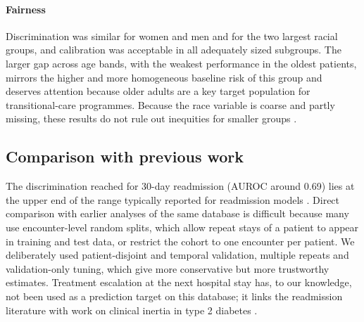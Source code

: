 \paragraph{Fairness}
Discrimination was similar for women and men and for the two largest racial
groups, and calibration was acceptable in all adequately sized subgroups.
The larger gap across age bands, with the weakest performance in the oldest
patients, mirrors the higher and more homogeneous baseline risk of this
group and deserves attention because older adults are a key target
population for transitional-care programmes. Because the race variable is
coarse and partly missing, these results do not rule out inequities for
smaller groups \citep{obermeyer2019}.

\subsection{Comparison with previous work}
The discrimination reached for 30-day readmission (AUROC around 0.69) lies
at the upper end of the range typically reported for readmission models
\citep{kansagara2011}. Direct comparison with earlier analyses of the same
database is difficult because many use encounter-level random splits, which
allow repeat stays of a patient to appear in training and test data, or
restrict the cohort to one encounter per patient. We deliberately used
patient-disjoint and temporal validation, multiple repeats and validation-only
tuning, which give more conservative but more trustworthy estimates.
Treatment escalation at the next hospital stay has, to our knowledge, not
been used as a prediction target on this database; it links the readmission
literature with work on clinical inertia in type 2 diabetes
\citep{khunti2013}.


